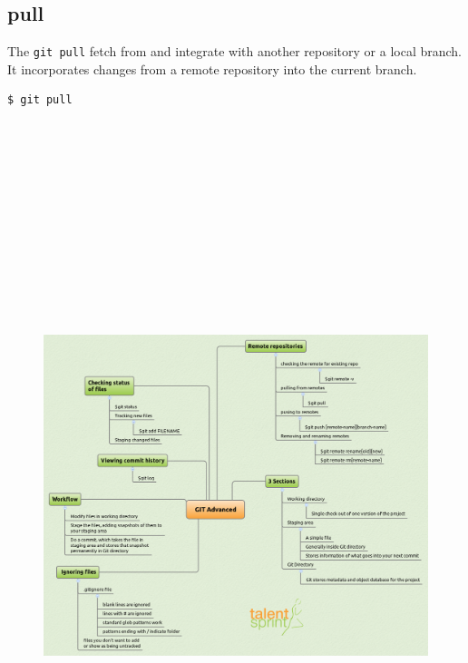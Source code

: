 \documentclass[11pt,a4paper]{article}
\begin{document}
\subsection*{pull}
The \texttt{git pull} fetch from and integrate with another repository or a local branch. It incorporates changes from a remote repository into the current branch. 
\begin{verbatim}
$ git pull
\end{verbatim} 
\vfill{\ }
\begin{figure}[H]
 \begin{center}
   \includegraphics[angle=90,height=20cm, width=13cm]{Git-MM-22.png}
 \end{center}
 \end{figure}
\end{document}
